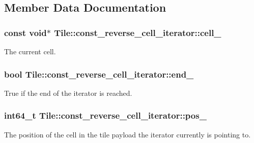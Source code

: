 \subsection{Member Data Documentation}
\hypertarget{classTile_1_1const__reverse__cell__iterator_aff4440933404acc746f7d82984ca9693}{}
\subsubsection[{cell\+\_\+}]{\setlength{\rightskip}{0pt plus 5cm}const void$\ast$ Tile\+::const\+\_\+reverse\+\_\+cell\+\_\+iterator\+::cell\+\_\+\hspace{0.3cm}{\ttfamily [private]}}\label{classTile_1_1const__reverse__cell__iterator_aff4440933404acc746f7d82984ca9693}
The current cell. \hypertarget{classTile_1_1const__reverse__cell__iterator_afbc5e95d644125daa6718bc0c9294ea0}{}
\subsubsection[{end\+\_\+}]{\setlength{\rightskip}{0pt plus 5cm}bool Tile\+::const\+\_\+reverse\+\_\+cell\+\_\+iterator\+::end\+\_\+\hspace{0.3cm}{\ttfamily [private]}}\label{classTile_1_1const__reverse__cell__iterator_afbc5e95d644125daa6718bc0c9294ea0}
True if the end of the iterator is reached. \hypertarget{classTile_1_1const__reverse__cell__iterator_a2daefcd8f14e67246204b137f61f070a}{}
\subsubsection[{pos\+\_\+}]{\setlength{\rightskip}{0pt plus 5cm}int64\+\_\+t Tile\+::const\+\_\+reverse\+\_\+cell\+\_\+iterator\+::pos\+\_\+\hspace{0.3cm}{\ttfamily [private]}}\label{classTile_1_1const__reverse__cell__iterator_a2daefcd8f14e67246204b137f61f070a}
The position of the cell in the tile payload the iterator currently is pointing to. \hypertarget{classTile_1_1const__reverse__cell__iterator_ac7fd010d43770d5816c3f98d0fa766be}{}
